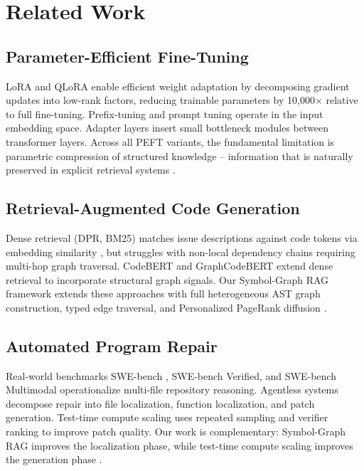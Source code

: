 \documentclass[10pt,journal,compsoc,twocolumn]{IEEEtran}
\begin{document}
\section{Related Work}



\subsection{Parameter-Efficient Fine-Tuning}


LoRA \cite{crossref_10_48550_arxiv_2106_09685} and QLoRA \cite{crossref_10_48550_arxiv_2305_14314} enable efficient weight adaptation by decomposing gradient updates into low-rank factors, reducing trainable parameters by 10,000$\times$ relative to full fine-tuning. Prefix-tuning \cite{arxiv_2101_00190} and prompt tuning operate in the input embedding space. Adapter layers \cite{arxiv_2005_14165} insert small bottleneck modules between transformer layers. Across all PEFT variants, the fundamental limitation is parametric compression of structured knowledge -- information that is naturally preserved in explicit retrieval systems \cite{arxiv_2101_00190}.


\subsection{Retrieval-Augmented Code Generation}


Dense retrieval (DPR, BM25) matches issue descriptions against code tokens via embedding similarity \cite{arxiv_2501_02842}, but struggles with non-local dependency chains requiring multi-hop graph traversal. CodeBERT \cite{arxiv_2002_08155} and GraphCodeBERT extend dense retrieval to incorporate structural graph signals. Our Symbol-Graph RAG framework extends these approaches with full heterogeneous AST graph construction, typed edge traversal, and Personalized PageRank diffusion \cite{crossref_10_1145_3689096_3689462}.


\subsection{Automated Program Repair}


Real-world benchmarks SWE-bench \cite{arxiv_2505_23419}, SWE-bench Verified, and SWE-bench Multimodal operationalize multi-file repository reasoning. Agentless systems \cite{arxiv_2501_02497} decompose repair into file localization, function localization, and patch generation. Test-time compute scaling \cite{arxiv_2203_11171} uses repeated sampling and verifier ranking to improve patch quality. Our work is complementary: Symbol-Graph RAG improves the localization phase, while test-time compute scaling improves the generation phase \cite{arxiv_2412_06333}.
\end{document}
